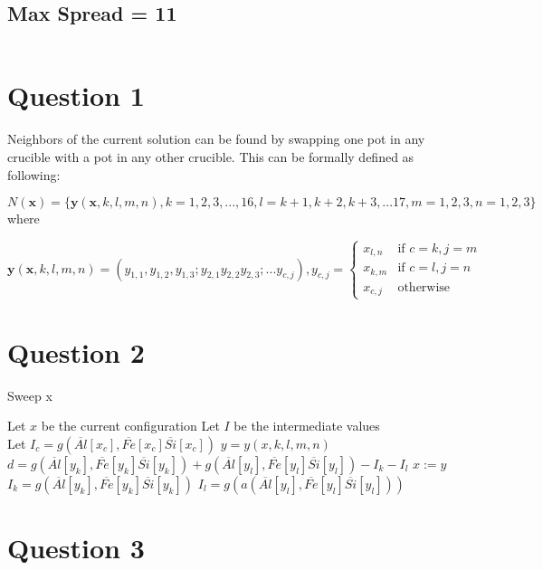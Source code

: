 \documentclass{article}
\begin{document}
\subsection{Max Spread = 11}
\begin{verbatim}
\end{verbatim}

\section{Question 1}
Neighbors of the current solution can be found by swapping one pot in
any crucible with a pot in any other crucible.
This can be formally defined as following:

$N(\mathbf{x}) = \{\mathbf{y}(\mathbf{x}, k, l, m, n), k=1,2,3,...,16, 
l=k+1,k+2,k+3,...17, m=1,2,3, n=1,2,3\}$ where

$$\mathbf{y}(\mathbf{x},k,l,m,n)=(y_{1, 1},y_{1, 2},y_{1, 3};
y_{2, 1}y_{2, 2}y_{2, 3};...y_{c, j}),y_{c,j}=
\begin{cases}
    x_{l, n} & \text{if } c=k,j=m \\
    x_{k, m} & \text{if } c=l,j=n \\
    x_{c,j} & \text{otherwise}
\end{cases}$$

\section{Question 2}
\begin{algorithm}
\caption{Sweep x}
\begin{algorithmic}
\STATE Let $x$ be the current configuration
\STATE Let $I$ be the intermediate values\\
\STATE Let $I_c = g(\overline{Al}[x_c], \overline{Fe}[x_c] \overline{Si}[x_c])$
\STATE $y = y(x, k, l, m, n)$ 
\STATE $d = g(\overline{Al}[y_k], \overline{Fe}[y_k] \overline{Si}[y_k]) + g(\overline{Al}[y_l], \overline{Fe}[y_l] \overline{Si}[y_l]) - I_k - I_l$
\STATE $x := y$ 
\STATE $I_k = g(\overline{Al}[y_k], \overline{Fe}[y_k] \overline{Si}[y_k])$ 
\STATE $I_l = g(a(\overline{Al}[y_l], \overline{Fe}[y_l] \overline{Si}[y_l]))$ 
\ENDIF
\ENDFOR
\end{algorithmic}
\end{algorithm}

\section{Question 3}
\end{document}
